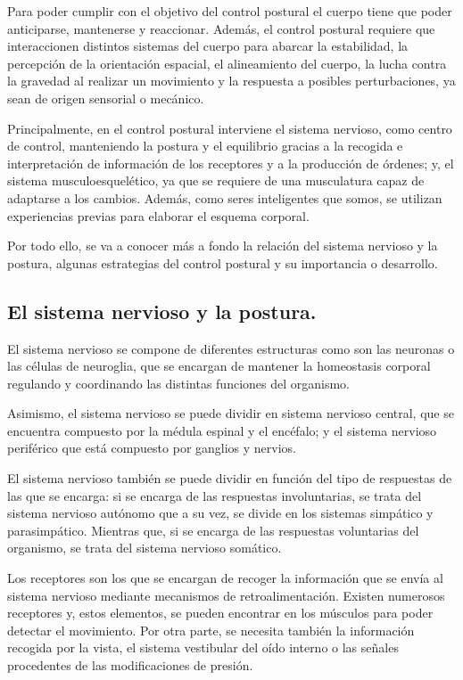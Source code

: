 Para poder cumplir con el objetivo del control postural el cuerpo tiene que poder anticiparse, mantenerse y reaccionar. Además, el control postural requiere que interaccionen distintos sistemas del cuerpo para abarcar la estabilidad, la percepción de la orientación espacial, el alineamiento del cuerpo, la lucha contra la gravedad al realizar un movimiento y la respuesta a posibles perturbaciones, ya sean de origen sensorial o mecánico.

Principalmente, en el control postural interviene el sistema nervioso, como centro de control, manteniendo la postura y el equilibrio gracias a la recogida e interpretación de información de los receptores y a la producción de órdenes; y, el sistema musculoesquelético, ya que se requiere de una musculatura capaz de adaptarse a los cambios. Además, como seres inteligentes que somos, se utilizan experiencias previas para elaborar el esquema corporal.

Por todo ello, se va a conocer más a fondo la relación del sistema nervioso y la postura, algunas estrategias del control postural y su importancia o desarrollo.


\subsection{El sistema nervioso y la postura.} 
El sistema nervioso se compone de diferentes estructuras como son las neuronas o las células de neuroglia, que se encargan de mantener la homeostasis corporal regulando y coordinando las distintas funciones del organismo.

Asimismo, el sistema nervioso se puede dividir en sistema nervioso central, que se encuentra compuesto por la médula espinal y el encéfalo; y el sistema nervioso periférico que está compuesto por ganglios y nervios.

El sistema nervioso también se puede dividir en función del tipo de respuestas de las que se encarga: si se encarga de las respuestas involuntarias, se trata del sistema nervioso autónomo que a su vez, se divide en los sistemas simpático y parasimpático. Mientras que, si se encarga de las respuestas voluntarias del organismo, se trata del sistema nervioso somático.

Los receptores son los que se encargan de recoger la información que se envía al sistema nervioso mediante mecanismos de retroalimentación. Existen numerosos receptores y, estos elementos, se pueden encontrar en los músculos para poder detectar el movimiento. Por otra parte, se necesita también la información recogida por la vista, el sistema vestibular del oído interno o las señales procedentes de las modificaciones de presión.

